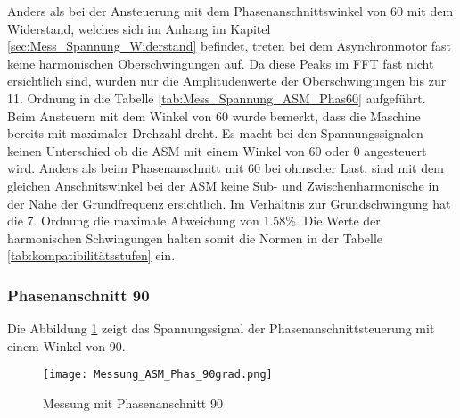 Anders als bei der Ansteuerung mit dem Phasenanschnittswinkel von 60\textdegree\hspace{0.02cm} mit dem Widerstand, welches sich im Anhang im Kapitel \ref{sec:Mess_Spannung_Widerstand} befindet, treten bei dem Asynchronmotor fast keine harmonischen Oberschwingungen auf. Da diese Peaks im FFT fast nicht ersichtlich sind, wurden nur die Amplitudenwerte der Oberschwingungen bis zur 11. Ordnung in die Tabelle \ref{tab:Mess_Spannung_ASM_Phas60} aufgeführt. 
Beim Ansteuern mit dem Winkel von 60\textdegree \hspace{0.02cm} wurde bemerkt, dass die Maschine bereits mit maximaler Drehzahl dreht. Es macht bei den Spannungssignalen keinen Unterschied ob die ASM mit einem Winkel von 60\textdegree \hspace{0.02cm} oder 0\textdegree \hspace{0.02cm} angesteuert wird. Anders als beim Phasenanschnitt mit 60\textdegree\hspace{0.02cm} bei ohmscher Last, sind mit dem gleichen Anschnitswinkel bei der ASM keine Sub- und Zwischenharmonische in der Nähe der Grundfrequenz ersichtlich. Im Verhältnis zur Grundschwingung hat die 7. Ordnung die maximale Abweichung von 1.58\%. Die Werte der harmonischen Schwingungen halten somit die Normen in der Tabelle \ref{tab:kompatibilitätsstufen} ein. 

\newpage
\subsubsection*{Phasenanschnitt 90\textdegree}
Die Abbildung \ref{fig:Mess_ASM_Phas90} zeigt das Spannungssignal der Phasenanschnittsteuerung mit einem Winkel von 90\textdegree.

\begin{figure}[ht!]
	\centering
	\texttt{[image: Messung\_ASM\_Phas\_90grad.png]}	
	\caption{Messung mit Phasenanschnitt 90\textdegree}\label{fig:Mess_ASM_Phas90}
\end{figure}

